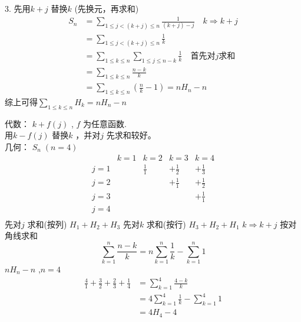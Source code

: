 \begin{solve}
    3. 先用$ k+j $ 替换$ k $ (先换元，再求和)
    \begin{align*}
        S_n 
        &= \sum_{1\leqslant j < (k+j)\leqslant n}\frac{1}{(k+j)-j} \quad k\Rightarrow k+j \\
        &= \sum_{1\leqslant j < (k+j)\leqslant n}\frac{1}{k} \\
        &= \sum_{1\leqslant k \leqslant n} \sum_{1\leqslant j \leqslant n-k}\frac{1}{k} \quad\text{首先对}j\text{求和} \\
        &= \sum_{1\leqslant k \leqslant n} \frac{n-k}{k}\\
        &= \sum_{1\leqslant k \leqslant n} \left( \frac{n}{k}-1 \right) = n H_n - n
    \end{align*}
    综上可得$ \sum_{1\leqslant k\leqslant n}H_k = n H_n - n $ 
\end{solve}
代数：
$ k+f(j) $ , $ f $ 为任意函数.\\
用$ k-f(j) $ 替换$ k $ ，并对$ j $ 先求和较好。\\
几何：
$ S_n \;(n=4) $ 
\begin{equation*}
    \begin{array}{ccccc}
            & k=1   & k=2   & k=3   & k=4   \\
        j=1 & & \frac{1}{1} & +\frac{1}{2} & +\frac{1}{3} \\
        j=2 & &             & +\frac{1}{1} & +\frac{1}{2} \\
        j=3 & &             &              & +\frac{1}{1} \\
        j=4 & &             &              &              \\
    \end{array}
\end{equation*}
先对$ j $ 求和(按列) $ H_1 + H_2 + H_3 $ 
先对$ k $ 求和(按行) $ H_3 + H_2 + H_1 $ 
$ k\Rightarrow k+j $ 按对角线求和 
\begin{equation*}
    \sum_{k=1}^{n}\frac{n-k}{k} = n \sum_{k=1}^{n}\frac{1}{k}-\sum_{k=1}^{n} 1
\end{equation*}
$ nH_n-n $ ,$ n=4 $ 
\begin{align*}
    \frac{4}{1}+\frac{3}{2}+\frac{2}{3}+\frac{1}{4} &= \sum_{k=1}^{4}\frac{4-k}{k} \\ 
    &= 4\sum_{k=1}^{4}\frac{1}{k}-\sum_{k=1}^{4} 1 \\
    &= 4H_4 - 4
\end{align*}
